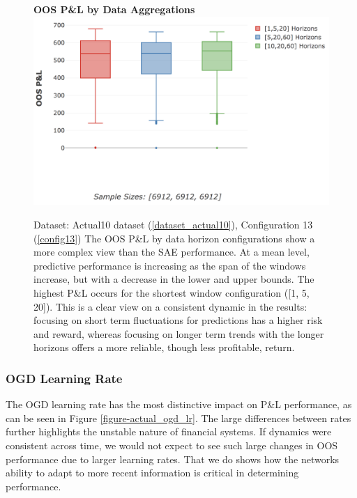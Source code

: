 \documentclass[a4paper,11pt,oneside]{article}
\theoremstyle{plain}
\theoremstyle{definition}
\begin{document}
	
	
		\begin{figure}[H]
		\centering 
		\textbf{OOS P\&L by Data Aggregations}
		\includegraphics[scale=0.4]{images/results/8_2_determinants/actual_aggregation_pl.png}
		\caption[OOS P\&L by Data Aggregations]
		{
			Dataset: Actual10 dataset (\ref{dataset_actual10}), Configuration 13 (\ref{config13})
			\newline \newline The OOS P\&L by data horizon configurations show a more complex view than the SAE performance. At a mean level, predictive performance is increasing as the span of the windows increase, but with a decrease in the lower and upper bounds. The highest P\&L occurs for the shortest window configuration ([1, 5, 20]). This is a clear view on a consistent dynamic in the results: focusing on short term fluctuations for predictions has a higher risk and reward, whereas focusing on longer term trends with the longer horizons offers a more reliable, though less profitable, return.}
		\label{figure-actual_aggregation_pl}
	\end{figure}
	
	\subsubsection{OGD Learning Rate}
	
	The OGD learning rate has the most distinctive impact on P\&L performance, as can be seen in Figure \ref{figure-actual_ogd_lr}. The large differences between rates further highlights the unstable nature of financial systems. If dynamics were consistent across time, we would not expect to see such large changes in OOS performance due to larger learning rates. That we do shows how the networks ability to adapt to more recent information is critical in determining performance. \newline
	
\end{document}

